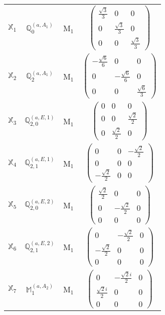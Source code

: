 \documentclass[fleqn,10pt,landscape]{article}
\begin{document}
\begin{itemize}
\begin{center}
\begin{longtable}{c|c|c|c}
$ \mathbb{X}_{1} $ & $\mathbb{Q}_{0}^{(a,A_{1})}$ & M$_{1}$ & $\begin{pmatrix} \frac{\sqrt{3}}{3} & 0 & 0 \\ 0 & \frac{\sqrt{3}}{3} & 0 \\ 0 & 0 & \frac{\sqrt{3}}{3} \end{pmatrix}$ \\
$ \mathbb{X}_{2} $ & $\mathbb{Q}_{2}^{(a,A_{1})}$ & M$_{1}$ & $\begin{pmatrix} - \frac{\sqrt{6}}{6} & 0 & 0 \\ 0 & - \frac{\sqrt{6}}{6} & 0 \\ 0 & 0 & \frac{\sqrt{6}}{3} \end{pmatrix}$ \\
$ \mathbb{X}_{3} $ & $\mathbb{Q}_{2,0}^{(a,E,1)}$ & M$_{1}$ & $\begin{pmatrix} 0 & 0 & 0 \\ 0 & 0 & \frac{\sqrt{2}}{2} \\ 0 & \frac{\sqrt{2}}{2} & 0 \end{pmatrix}$ \\
$ \mathbb{X}_{4} $ & $\mathbb{Q}_{2,1}^{(a,E,1)}$ & M$_{1}$ & $\begin{pmatrix} 0 & 0 & - \frac{\sqrt{2}}{2} \\ 0 & 0 & 0 \\ - \frac{\sqrt{2}}{2} & 0 & 0 \end{pmatrix}$ \\
$ \mathbb{X}_{5} $ & $\mathbb{Q}_{2,0}^{(a,E,2)}$ & M$_{1}$ & $\begin{pmatrix} \frac{\sqrt{2}}{2} & 0 & 0 \\ 0 & - \frac{\sqrt{2}}{2} & 0 \\ 0 & 0 & 0 \end{pmatrix}$ \\
$ \mathbb{X}_{6} $ & $\mathbb{Q}_{2,1}^{(a,E,2)}$ & M$_{1}$ & $\begin{pmatrix} 0 & - \frac{\sqrt{2}}{2} & 0 \\ - \frac{\sqrt{2}}{2} & 0 & 0 \\ 0 & 0 & 0 \end{pmatrix}$ \\
$ \mathbb{X}_{7} $ & $\mathbb{M}_{1}^{(a,A_{2})}$ & M$_{1}$ & $\begin{pmatrix} 0 & - \frac{\sqrt{2} i}{2} & 0 \\ \frac{\sqrt{2} i}{2} & 0 & 0 \\ 0 & 0 & 0 \end{pmatrix}$ \\

\end{longtable}
\end{center}
\end{itemize}
\end{document}
